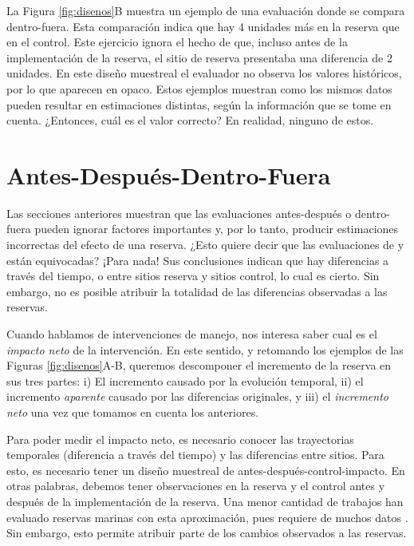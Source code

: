 \documentclass[]{krantz}
\begin{document}
La Figura \ref{fig:disenos}B muestra un ejemplo de una evaluación donde
se compara dentro-fuera. Esta comparación indica que hay 4 unidades más
en la reserva que en el control. Este ejercicio ignora el hecho de que,
incluso antes de la implementación de la reserva, el sitio de reserva
presentaba una diferencia de 2 unidades. En este diseño muestreal el
evaluador no observa los valores históricos, por lo que aparecen en
opaco. Estos ejemplos muestran como los mismos datos pueden resultar en
estimaciones distintas, según la información que se tome en cuenta.
¿Entonces, cuál es el valor correcto? En realidad, ninguno de estos.

\hypertarget{antes-despues-dentro-fuera}{%
\section{Antes-Después-Dentro-Fuera}\label{antes-despues-dentro-fuera}}

Las secciones anteriores muestran que las evaluaciones antes-después o
dentro-fuera pueden ignorar factores importantes y, por lo tanto,
producir estimaciones incorrectas del efecto de una reserva. ¿Esto
quiere decir que las evaluaciones de \citet{wantiez_1997} y
\citet{guidetti_2014} están equivocadas? ¡Para nada! Sus conclusiones
indican que hay diferencias a través del tiempo, o entre sitios reserva
y sitios control, lo cual es cierto. Sin embargo, no es posible atribuir
la totalidad de las diferencias observadas a las reservas.

Cuando hablamos de intervenciones de manejo, nos interesa saber cual es
el \emph{impacto neto} de la intervención. En este sentido, y retomando
los ejemplos de las Figuras \ref{fig:disenos}A-B, queremos descomponer
el incremento de la reserva en sus tres partes: i) El incremento causado
por la evolución temporal, ii) el incremento \emph{aparente} causado por
las diferencias originales, y iii) el \emph{incremento neto} una vez que
tomamos en cuenta los anteriores.

Para poder medir el impacto neto, es necesario conocer las trayectorias
temporales (diferencia a través del tiempo) y las diferencias entre
sitios. Para esto, es necesario tener un diseño muestreal de
antes-después-control-impacto. En otras palabras, debemos tener
observaciones en la reserva y el control antes y después de la
implementación de la reserva. Una menor cantidad de trabajos han
evaluado reservas marinas con esta aproximación, pues requiere de muchos
datos \citep{moland_2013, villasenorderbez_2018}. Sin embargo, esto
permite atribuir parte de los cambios observados a las reservas.
\end{document}
